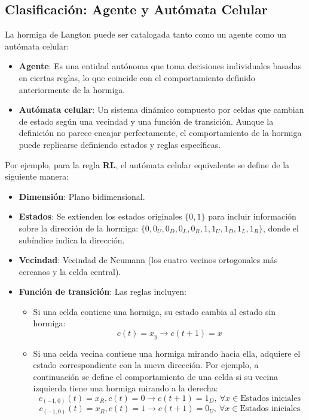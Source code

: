 \documentclass[12pt,twoside]{article}
\begin{document}
	\subsection{Clasificación: Agente y Autómata Celular}
	
	La hormiga de Langton puede ser catalogada tanto como un agente como un autómata celular:  
	\begin{itemize}
		\item \textbf{Agente}: Es una entidad autónoma que toma decisiones individuales basadas en ciertas reglas, lo que coincide con el comportamiento definido anteriormente de la hormiga.  
		\item \textbf{Autómata celular}: Un sistema dinámico compuesto por celdas que cambian de estado según una vecindad y una función de transición. Aunque la definición no parece encajar perfectamente, el comportamiento de la hormiga puede replicarse definiendo estados y reglas específicas.  
	\end{itemize}
	
	Por ejemplo, para la regla \textbf{RL}, el autómata celular equivalente se define de la siguiente manera: 
	\begin{itemize}
		\item \textbf{Dimensión}: Plano bidimensional.  
		\item \textbf{Estados}: Se extienden los estados originales $\{0, 1\}$ para incluir información sobre la dirección de la hormiga: $\{0, 0_U, 0_D, 0_L, 0_R, 1, 1_U, 1_D, 1_L, 1_R\}$, donde el subíndice indica la dirección.  
		\item \textbf{Vecindad}: Vecindad de Neumann (los cuatro vecinos ortogonales más cercanos y la celda central).  
		\item \textbf{Función de transición}: Las reglas incluyen:  
		\begin{itemize}
			\item Si una celda contiene una hormiga, su estado cambia al estado sin hormiga:  
			\[ c(t) = x_y \rightarrow c(t+1) = x \]  
			\item Si una celda vecina contiene una hormiga mirando hacia ella, adquiere el estado correspondiente con la nueva dirección. Por ejemplo, a continuación se define el comportamiento de una celda si su vecina izquierda tiene una hormiga mirando a la derecha:  
			\[
			c_{(-1, 0)}(t) = x_R, c(t) = 0 \rightarrow c(t+1) = 1_D, \: \forall x \in \text{Estados iniciales}
			\]
			\[
			c_{(-1, 0)}(t) = x_R, c(t) = 1 \rightarrow c(t+1) = 0_U, \: \forall x \in \text{Estados iniciales}
			\]
		\end{itemize}
	\end{itemize}
	
\end{document}
